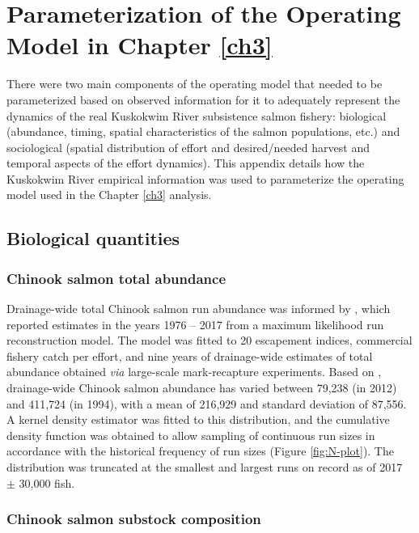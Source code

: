 \documentclass[12pt,]{book}
\theoremstyle{definition}
\theoremstyle{definition}
\theoremstyle{definition}
\theoremstyle{remark}
\begin{document}
\appendix


\captionsetup[figure]{list=yes} \captionsetup[table]{list=yes}

\chapter{Parameterization of the Operating Model in Chapter
\ref{ch3}}\label{appendix-a}

\noindent
There were two main components of the operating model that needed to be
parameterized based on observed information for it to adequately
represent the dynamics of the real Kuskokwim River subsistence salmon
fishery: biological (abundance, timing, spatial characteristics of the
salmon populations, etc.) and sociological (spatial distribution of
effort and desired/needed harvest and temporal aspects of the effort
dynamics). This appendix details how the Kuskokwim River empirical
information was used to parameterize the operating model used in the
Chapter \ref{ch3} analysis.

\section{Biological quantities}\label{biological-quantities}

\subsection{Chinook salmon total abundance}\label{mse-data-N}

\noindent
Drainage-wide total Chinook salmon run abundance was informed by
\citet{liller-etal-2018}, which reported estimates in the years 1976 --
2017 from a maximum likelihood run reconstruction model. The model was
fitted to 20 escapement indices, commercial fishery catch per effort,
and nine years of drainage-wide estimates of total abundance obtained
\emph{via} large-scale mark-recapture experiments. Based on
\citet{liller-etal-2018}, drainage-wide Chinook salmon abundance has
varied between 79,238 (in 2012) and 411,724 (in 1994), with a mean of
216,929 and standard deviation of 87,556. A kernel density estimator was
fitted to this distribution, and the cumulative density function was
obtained to allow sampling of continuous run sizes in accordance with
the historical frequency of run sizes (Figure \ref{fig:N-plot}). The
distribution was truncated at the smallest and largest runs on record as
of 2017 \(\pm\) 30,000 fish.

\subsection{Chinook salmon substock composition}\label{mse-data-pi}
\end{document}
